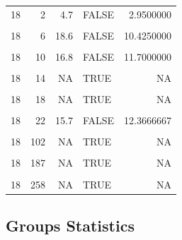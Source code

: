 \documentclass[
]{book}
\begin{document}
\begin{table}[!h]
\begin{tabular}{r|r|r|l|r}
\cellcolor{gray!6}{18} & \cellcolor{gray!6}{0} & \cellcolor{gray!6}{1.2} & \cellcolor{gray!6}{FALSE} & \cellcolor{gray!6}{1.2000000}\\
\hline
18 & 2 & 4.7 & FALSE & 2.9500000\\
\hline
\cellcolor{gray!6}{18} & \cellcolor{gray!6}{4} & \cellcolor{gray!6}{17.2} & \cellcolor{gray!6}{FALSE} & \cellcolor{gray!6}{7.7000000}\\
\hline
18 & 6 & 18.6 & FALSE & 10.4250000\\
\hline
\cellcolor{gray!6}{18} & \cellcolor{gray!6}{8} & \cellcolor{gray!6}{NA} & \cellcolor{gray!6}{TRUE} & \cellcolor{gray!6}{NA}\\
\hline
18 & 10 & 16.8 & FALSE & 11.7000000\\
\hline
\cellcolor{gray!6}{18} & \cellcolor{gray!6}{12} & \cellcolor{gray!6}{NA} & \cellcolor{gray!6}{TRUE} & \cellcolor{gray!6}{NA}\\
\hline
18 & 14 & NA & TRUE & NA\\
\hline
\cellcolor{gray!6}{18} & \cellcolor{gray!6}{16} & \cellcolor{gray!6}{NA} & \cellcolor{gray!6}{TRUE} & \cellcolor{gray!6}{NA}\\
\hline
18 & 18 & NA & TRUE & NA\\
\hline
\cellcolor{gray!6}{18} & \cellcolor{gray!6}{20} & \cellcolor{gray!6}{NA} & \cellcolor{gray!6}{TRUE} & \cellcolor{gray!6}{NA}\\
\hline
18 & 22 & 15.7 & FALSE & 12.3666667\\
\hline
\cellcolor{gray!6}{18} & \cellcolor{gray!6}{24} & \cellcolor{gray!6}{22.5} & \cellcolor{gray!6}{FALSE} & \cellcolor{gray!6}{13.8142857}\\
\hline
18 & 102 & NA & TRUE & NA\\
\hline
\cellcolor{gray!6}{18} & \cellcolor{gray!6}{138} & \cellcolor{gray!6}{NA} & \cellcolor{gray!6}{TRUE} & \cellcolor{gray!6}{NA}\\
\hline
18 & 187 & NA & TRUE & NA\\
\hline
\cellcolor{gray!6}{18} & \cellcolor{gray!6}{224} & \cellcolor{gray!6}{NA} & \cellcolor{gray!6}{TRUE} & \cellcolor{gray!6}{NA}\\
\hline
18 & 258 & NA & TRUE & NA\\
\hline
\end{tabular}
\end{table}

\hypertarget{groups-statistics}{%
\subsection{Groups Statistics}\label{groups-statistics}}
\end{document}

